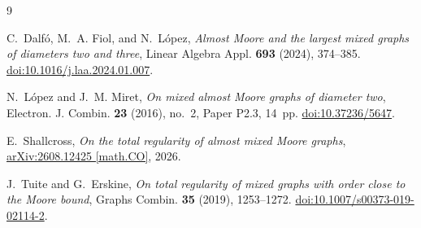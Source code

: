 \documentclass[11pt]{amsart}
\begin{document}
\begin{thebibliography}{9}

C.~Dalf\'o, M.~A. Fiol, and N.~L\'opez,
\emph{Almost Moore and the largest mixed graphs of diameters two and
three},
Linear Algebra Appl. \textbf{693} (2024), 374--385.
\href{https://doi.org/10.1016/j.laa.2024.01.007}
{doi:10.1016/j.laa.2024.01.007}.

N.~L\'opez and J.~M. Miret,
\emph{On mixed almost Moore graphs of diameter two},
Electron. J. Combin. \textbf{23} (2016), no.~2,
Paper P2.3, 14~pp.
\href{https://doi.org/10.37236/5647}
{doi:10.37236/5647}.

E.~Shallcross,
\emph{On the total regularity of almost mixed Moore graphs},
\href{https://arxiv.org/abs/2608.12425}
{arXiv:2608.12425 [math.CO]}, 2026.

J.~Tuite and G.~Erskine,
\emph{On total regularity of mixed graphs with order close to the
Moore bound},
Graphs Combin. \textbf{35} (2019), 1253--1272.
\href{https://doi.org/10.1007/s00373-019-02114-2}
{doi:10.1007/s00373-019-02114-2}.

\end{thebibliography}
\end{document}
